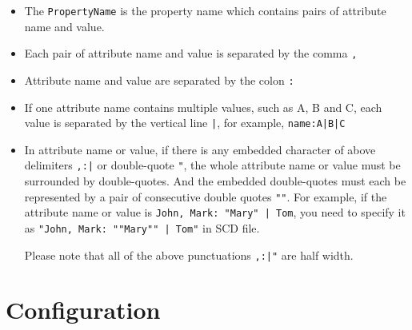 \begin{itemize}
\item The \verb!PropertyName! is the property name which contains pairs of attribute name and value.

\item Each pair of attribute name and value is separated by the comma \verb!,!

\item Attribute name and value are separated by the colon \verb!:!

\item If one attribute name contains multiple values, such as A, B and C, each value is separated by the vertical line \verb!|!, for example, \verb!name:A|B|C!

\item In attribute name or value, if there is any embedded character of above delimiters \verb!,:|! or double-quote \verb!"!, the whole attribute name or value must be surrounded by double-quotes.
And the embedded double-quotes must each be represented by a pair of consecutive double quotes \verb!""!.
For example, if the attribute name or value is \verb!John, Mark: "Mary" | Tom!, you need to specify it as \verb!"John, Mark: ""Mary"" | Tom"! in SCD file.

Please note that all of the above punctuations \verb!,:|"! are half width.

\end{itemize}


\section{Configuration}
